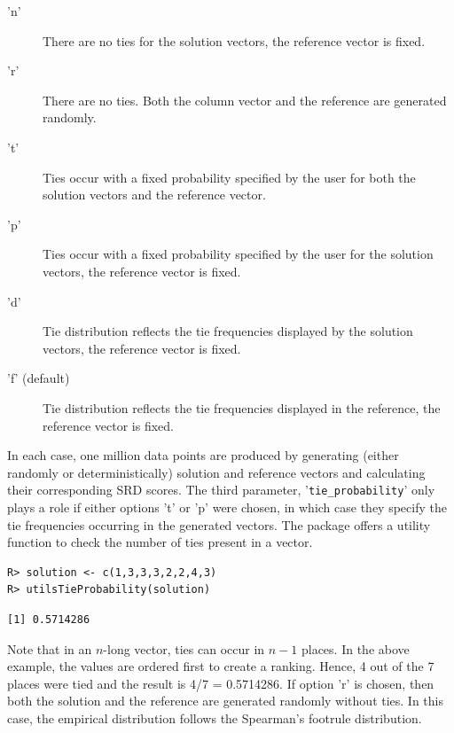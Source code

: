 \begin{description}
    \item['n'] There are no ties for the solution vectors, the reference vector is fixed.

    \item['r'] There are no ties. Both the column vector and the reference are generated randomly.

    \item['t'] Ties occur with a fixed probability specified by the user for both the solution vectors and the reference vector.

    \item['p'] Ties occur with a fixed probability specified by the user for the solution vectors, the reference vector is fixed.

    \item['d'] Tie distribution reflects the tie frequencies displayed by the solution vectors, the reference vector is fixed.

    \item['f' (default)] Tie distribution reflects the tie frequencies displayed in the reference, the reference vector is fixed.
\end{description}

In each case, one million data points are produced by generating (either randomly or deterministically) solution and reference vectors and calculating their corresponding SRD scores. The third parameter, '\texttt{tie\_probability}' only plays a role if either options 't'  or 'p' were chosen, in which case they specify the tie frequencies occurring in the generated vectors. The package offers a utility function to check the number of ties present in a vector.

\begin{verbatim}
R> solution <- c(1,3,3,3,2,2,4,3)
R> utilsTieProbability(solution)
\end{verbatim}
\begin{verbatim}
[1] 0.5714286
\end{verbatim}

Note that in an $n$-long vector, ties can occur in $n-1$ places. In the above example, the values are ordered first to create a ranking. Hence, 4 out of the 7 places were tied and the result is 4/7 = 0.5714286. If option 'r' is chosen, then both the solution and the reference are generated randomly without ties. In this case, the empirical distribution follows the Spearman's footrule distribution.

